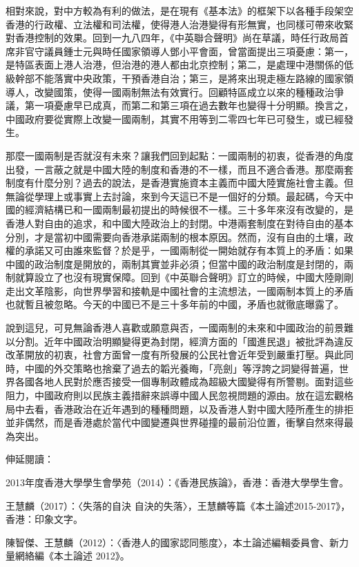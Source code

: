 相對來說，對中方較為有利的做法，是在現有《基本法》的框架下以各種手段架空香港的行政權、立法權和司法權，使得港人治港變得有形無實，也同樣可帶來收緊對香港控制的效果。回到一九八四年，《中英聯合聲明》尚在草議，時任行政局首席非官守議員鍾士元與時任國家領導人鄧小平會面，曾當面提出三項憂慮：第一，是特區表面上港人治港，但治港的港人都由北京控制；第二，是處理中港關係的低級幹部不能落實中央政策，干預香港自治；第三，是將來出現走極左路線的國家領導人，改變國策，使得一國兩制無法有效實行。回顧特區成立以來的種種政治爭議，第一項憂慮早已成真，而第二和第三項在過去數年也變得十分明顯。換言之，中國政府要從實際上改變一國兩制，其實不用等到二零四七年已可發生，或已經發生。

那麼一國兩制是否就沒有未來？讓我們回到起點：一國兩制的初衷，從香港的角度出發，一言蔽之就是中國大陸的制度和香港的不一樣，而且不適合香港。那麼兩套制度有什麼分別？過去的說法，是香港實施資本主義而中國大陸實施社會主義。但無論從學理上或事實上去討論，來到今天這已不是一個好的分類。最起碼，今天中國的經濟結構已和一國兩制最初提出的時候很不一樣。三十多年來沒有改變的，是香港人對自由的追求，和中國大陸政治上的封閉。中港兩套制度在對待自由的基本分別，才是當初中國需要向香港承諾兩制的根本原因。然而，沒有自由的土壤，政權的承諾又可由誰來監督？於是乎，一國兩制從一開始就存有本質上的矛盾：如果中國的政治制度是開放的，兩制其實並非必須；但當中國的政治制度是封閉的，兩制就算設立了也沒有現實保障。回到《中英聯合聲明》訂立的時候，中國大陸剛剛走出文革陰影，向世界學習和接軌是中國社會的主流想法，一國兩制本質上的矛盾也就暫且被忽略。今天的中國已不是三十多年前的中國，矛盾也就徹底曝露了。

說到這兒，可見無論香港人喜歡或願意與否，一國兩制的未來和中國政治的前景難以分割。近年中國政治明顯變得更為封閉，經濟方面的「國進民退」被批評為違反改革開放的初衷，社會方面曾一度有所發展的公民社會近年受到嚴重打壓。與此同時，中國的外交策略也捨棄了過去的韜光養晦，「亮劍」等浮誇之詞變得普遍，世界各國各地人民對於應否接受一個專制政體成為超級大國變得有所警剔。面對這些阻力，中國政府則以民族主義措辭來誤導中國人民忽視問題的源由。放在這宏觀格局中去看，香港政治在近年遇到的種種問題，以及香港人對中國大陸所產生的排拒並非偶然，而是香港處於當代中國變遷與世界碰撞的最前沿位置，衝擊自然來得最為突出。



伸延閱讀：

2013年度香港大學學生會學苑（2014）：《香港民族論》，香港：香港大學學生會。

王慧麟（2017）：〈失落的自決 自決的失落〉，王慧麟等篇《本土論述2015-2017》，香港：印象文字。

陳智傑、王慧麟（2012）：〈香港人的國家認同態度〉，本土論述編輯委員會、新力量網絡編《本土論述 2012》。